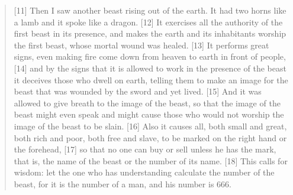 \begin{quote}
    [11] Then I saw another beast rising out of the earth.  It had two horns
    like a lamb and it spoke like a dragon.  [12] It exercises all the
    authority of the first beast in its presence, and makes the earth and its
    inhabitants worship the first beast, whose mortal wound was healed.  [13]
    It performs great signs, even making fire come down from heaven to earth
    in front of people, [14] and by the signs that it is allowed to work in
    the presence of the beast it deceives those who dwell on earth, telling
    them to make an image for the beast that was wounded by the sword and yet
    lived.  [15] And it was allowed to give breath to the image of the beast,
    so that the image of the beast might even speak and might cause those who
    would not worship the image of the beast to be slain.  [16] Also it
    causes all, both small and great, both rich and poor, both free and
    slave, to be marked on the right hand or the forehead, [17] so that no
    one can buy or sell unless he has the mark, that is, the name of the
    beast or the number of its name.  [18] This calls for wisdom: let the one
    who has understanding calculate the number of the beast, for it is the
    number of a man, and his number is 666.
  \end{quote}
